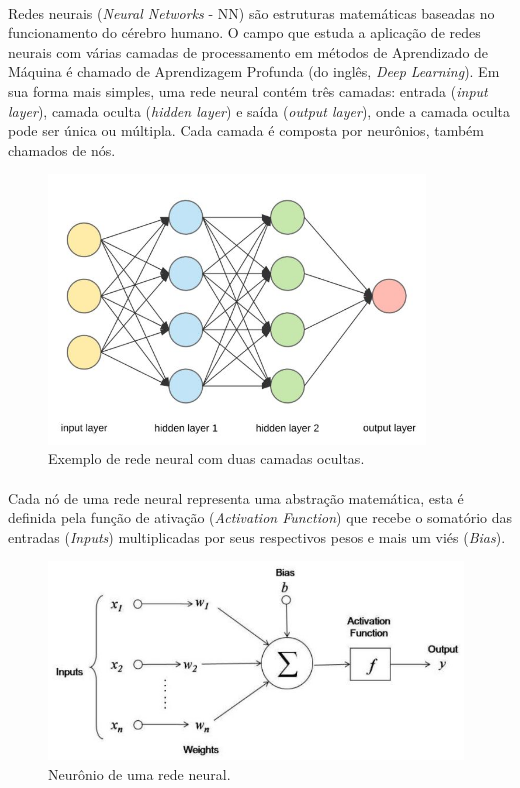 \documentclass[grad,numbers]{coppe}
\begin{document}
	  \paragraph{}Redes neurais (\textit{Neural Networks} - NN) são estruturas matemáticas baseadas no funcionamento do cérebro humano. O campo que estuda a aplicação de redes neurais com várias camadas de processamento em métodos de Aprendizado de Máquina é chamado de Aprendizagem Profunda (do inglês, \textit{Deep Learning}). Em sua forma mais simples, uma rede neural contém três camadas: entrada (\textit{input layer}), camada oculta (\textit{hidden layer}) e saída (\textit{output layer}), onde a camada oculta pode ser única ou múltipla. Cada camada é composta por neurônios, também chamados de nós.
	  \begin{figure}[h]
	  	\centering
	  	\includegraphics[width=10cm]{nn1.jpg}
	  	\caption{Exemplo de rede neural com duas camadas ocultas\cite{nn1-example}.}
	  	\label{fig:nn1-fig}
	  \end{figure}
  	\paragraph{}Cada nó de uma rede neural representa uma abstração matemática, esta é definida pela função de ativação (\textit{Activation Function}) que recebe o somatório das entradas (\textit{Inputs}) multiplicadas por seus respectivos pesos e mais um viés (\textit{Bias}).
  	\begin{figure}[h]
  		\centering
  		\includegraphics[width=11cm]{nn2.jpg}
  		\caption{Neurônio de uma rede neural\cite{nn2-example}.}
  		\label{fig:nn2-fig}
  	\end{figure}
\end{document}
